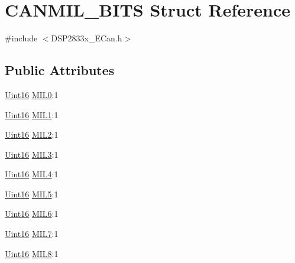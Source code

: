 \hypertarget{struct_c_a_n_m_i_l___b_i_t_s}{}\section{C\+A\+N\+M\+I\+L\+\_\+\+B\+I\+T\+S Struct Reference}
\label{struct_c_a_n_m_i_l___b_i_t_s}


{\ttfamily \#include $<$D\+S\+P2833x\+\_\+\+E\+Can.\+h$>$}

\subsection*{Public Attributes}
\begin{DoxyCompactItemize}
\item 
\hyperlink{_d_s_p2833x___device_8h_a59a9f6be4562c327cbfb4f7e8e18f08b}{Uint16} \hyperlink{struct_c_a_n_m_i_l___b_i_t_s_aebfebd2f38aacec3d62586c9afdb5ff9}{M\+I\+L0}\+:1
\item 
\hyperlink{_d_s_p2833x___device_8h_a59a9f6be4562c327cbfb4f7e8e18f08b}{Uint16} \hyperlink{struct_c_a_n_m_i_l___b_i_t_s_a3e86f5a3a82d88647353151a7fd2ba8b}{M\+I\+L1}\+:1
\item 
\hyperlink{_d_s_p2833x___device_8h_a59a9f6be4562c327cbfb4f7e8e18f08b}{Uint16} \hyperlink{struct_c_a_n_m_i_l___b_i_t_s_a837d5ad78c2230d0f5c643626973b6b2}{M\+I\+L2}\+:1
\item 
\hyperlink{_d_s_p2833x___device_8h_a59a9f6be4562c327cbfb4f7e8e18f08b}{Uint16} \hyperlink{struct_c_a_n_m_i_l___b_i_t_s_a1223b63849892605c127cebda9c59999}{M\+I\+L3}\+:1
\item 
\hyperlink{_d_s_p2833x___device_8h_a59a9f6be4562c327cbfb4f7e8e18f08b}{Uint16} \hyperlink{struct_c_a_n_m_i_l___b_i_t_s_a8a2903d6e8a0fe2277e59291a0294f3f}{M\+I\+L4}\+:1
\item 
\hyperlink{_d_s_p2833x___device_8h_a59a9f6be4562c327cbfb4f7e8e18f08b}{Uint16} \hyperlink{struct_c_a_n_m_i_l___b_i_t_s_a8142a31ba580fc88e669b25f64f5124e}{M\+I\+L5}\+:1
\item 
\hyperlink{_d_s_p2833x___device_8h_a59a9f6be4562c327cbfb4f7e8e18f08b}{Uint16} \hyperlink{struct_c_a_n_m_i_l___b_i_t_s_a147c7ac07e082bbb1bf7b329bd3a0d99}{M\+I\+L6}\+:1
\item 
\hyperlink{_d_s_p2833x___device_8h_a59a9f6be4562c327cbfb4f7e8e18f08b}{Uint16} \hyperlink{struct_c_a_n_m_i_l___b_i_t_s_a1565ab40551475e27aae8211f776eff2}{M\+I\+L7}\+:1
\item 
\hyperlink{_d_s_p2833x___device_8h_a59a9f6be4562c327cbfb4f7e8e18f08b}{Uint16} \hyperlink{struct_c_a_n_m_i_l___b_i_t_s_a68595bc692d640a4ca7a66684f9d0fa2}{M\+I\+L8}\+:1

\end{DoxyCompactItemize}
